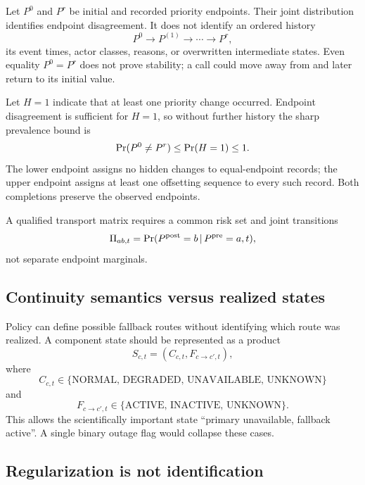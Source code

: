 \documentclass[11pt]{article}
\begin{document}
Let $P^0$ and $P^r$ be initial and recorded priority endpoints. Their joint distribution identifies endpoint disagreement. It does not identify an ordered history
\begin{equation}
P^0\rightarrow P^{(1)}\rightarrow\cdots\rightarrow P^r,
\end{equation}
its event times, actor classes, reasons, or overwritten intermediate states. Even equality $P^0=P^r$ does not prove stability; a call could move away from and later return to its initial value.

Let $H=1$ indicate that at least one priority change occurred. Endpoint disagreement is sufficient for $H=1$, so without further history the sharp prevalence bound is
\begin{equation}
\Pr(P^0\ne P^r)
\le \Pr(H=1)\le 1.
\label{eq:priority_history_bound}
\end{equation}
The lower endpoint assigns no hidden changes to equal-endpoint records; the upper endpoint assigns at least one offsetting sequence to every such record. Both completions preserve the observed endpoints.

A qualified transport matrix requires a common risk set and joint transitions
\begin{equation}
\Pi_{ab,t}=\Pr(P^{\mathrm{post}}=b\,|\, P^{\mathrm{pre}}=a,t),
\end{equation}
not separate endpoint marginals.

\subsection{Continuity semantics versus realized states}

Policy can define possible fallback routes without identifying which route was realized. A component state should be represented as a product
\begin{equation}
S_{c,t}=(C_{c,t},F_{c\to c',t}),
\end{equation}
where
\begin{equation}
C_{c,t}\in\{\text{NORMAL, DEGRADED, UNAVAILABLE, UNKNOWN}\}
\end{equation}
and
\begin{equation}
F_{c\to c',t}\in\{\text{ACTIVE, INACTIVE, UNKNOWN}\}.
\end{equation}
This allows the scientifically important state \enquote{primary unavailable, fallback active}. A single binary outage flag would collapse these cases.

\subsection{Regularization is not identification}
\end{document}
